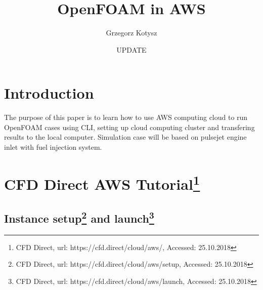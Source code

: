 \documentclass[12pt,english]{article}
\begin{document}

\title{OpenFOAM in AWS}


\author{Grzegorz Kotysz}


\date{UPDATE}

\maketitle
\newpage{}

\tableofcontents{}

\newpage{}

\section{Introduction}

The purpose of this paper is to learn how to use AWS computing cloud to run OpenFOAM cases using CLI, setting up cloud computing cluster and transfering results to the local computer. Simulation case will be based on pulsejet engine inlet with fuel injection system.

\section{CFD Direct AWS 	Tutorial\footnote{CFD Direct, url: https://cfd.direct/cloud/aws/, Accessed: 25.10.2018}}

\subsection{Instance setup\footnote{CFD Direct, url: https://cfd.direct/cloud/aws/setup, Accessed: 25.10.2018} and launch\footnote{CFD Direct, url: https://cfd.direct/cloud/aws/launch, Accessed: 25.10.2018}}
\end{document}
